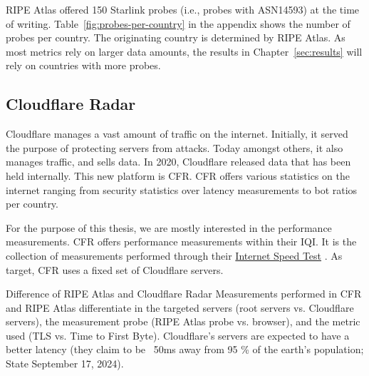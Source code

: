 RIPE Atlas offered 150 Starlink probes (i.e., probes with ASN14593) at the time
of writing. Table~\ref{fig:probes-per-country} in the appendix shows the number
of probes per country. The originating country is determined by RIPE Atlas. As
most metrics rely on larger data amounts, the results in
Chapter~\ref{sec:results} will rely on countries with more probes.

\subsection{Cloudflare Radar} \label{sec:cloudflare-radar}

Cloudflare manages a vast amount of traffic on the internet. Initially, it
served the purpose of protecting servers from attacks. Today amongst others, it
also manages traffic, and sells data. In 2020, Cloudflare released data that
has been held internally. This new platform is \ac{CFR}. \ac{CFR} offers
various statistics on the internet ranging from security statistics over
latency measurements to bot ratios per country.

For the purpose of this thesis, we are mostly interested in the performance
measurements. \ac{CFR} offers performance measurements within their \ac{IQI}.
It is the collection of measurements performed through their
\href{https://speed.cloudflare.com/}{Internet Speed Test}
\cite{DavidBelson2023, CloudflareRadarDocsIQI}. As target, \ac{CFR} uses a
fixed set of Cloudflare servers.

\begin{takeaway}{Difference of RIPE Atlas and Cloudflare Radar}
	Measurements performed in \ac{CFR} and RIPE Atlas differentiate in the
	targeted servers (root servers vs. Cloudflare servers), the measurement
	probe (RIPE Atlas probe vs. browser), and the metric used (TLS vs. Time
	to First Byte). Cloudflare's servers are expected to have a better
	latency (they claim to be ~50ms away from 95 \% of the earth's
	population; State September 17, 2024).
\end{takeaway}

